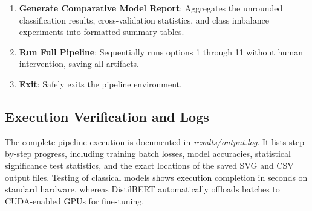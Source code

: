 \documentclass[11pt]{article}
\begin{document}
\begin{enumerate}
    \item \textbf{Generate Comparative Model Report}: Aggregates the unrounded classification results, cross-validation statistics, and class imbalance experiments into formatted summary tables.
    \item \textbf{Run Full Pipeline}: Sequentially runs options 1 through 11 without human intervention, saving all artifacts.
    \item[\textbf{0.}] \textbf{Exit}: Safely exits the pipeline environment.
\end{enumerate}

\subsection{Execution Verification and Logs}
The complete pipeline execution is documented in \textit{results/output.log}. It lists step-by-step progress, including training batch losses, model accuracies, statistical significance test statistics, and the exact locations of the saved SVG and CSV output files. Testing of classical models shows execution completion in seconds on standard hardware, whereas DistilBERT automatically offloads batches to CUDA-enabled GPUs for fine-tuning.
\end{document}
